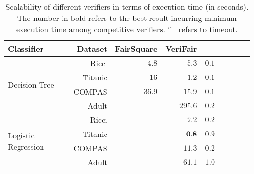 \begin{table}[!t]
	\caption[Scalability of {\justicia}]{Scalability of different verifiers in terms of execution time (in seconds). The number in bold refers to the best result incurring minimum execution time among competitive verifiers. `\textemdash'~ refers to timeout.}
	\label{fairness_justicia_tab:FS_VF_Justicia}
	\centering
	\begin{tabular}{lrrrrrrrr}
		\toprule
		Classifier & Dataset & FairSquare & VeriFair & {\justicia} \\
		\midrule
		\multirow{4}{*}{Decision Tree} & Ricci & $ 4.8 $ & $ 5.3 $ & $ \mathbf{0.1} $ \\
		& Titanic & $ 16 $ & $ 1.2 $ & $ \mathbf{0.1} $ \\
		& COMPAS & $ 36.9 $ & $ 15.9 $ & $ \mathbf{0.1} $ \\
		& Adult & \textemdash & $ 295.6 $ & $ \mathbf{0.2} $ \\
		\midrule
		\multirow{4}{*}{Logistic Regression} & Ricci & \textemdash & $ 2.2 $ & $ \mathbf{0.2} $ \\
		& Titanic & \textemdash & $ \textbf{0.8} $ & $ 0.9 $ \\
		& COMPAS & \textemdash & $ 11.3 $ & $ \mathbf{0.2} $ \\
		& Adult & \textemdash & $ 61.1 $ & $ \mathbf{1.0} $ \\
		
		\bottomrule
		
	\end{tabular}
\end{table}
